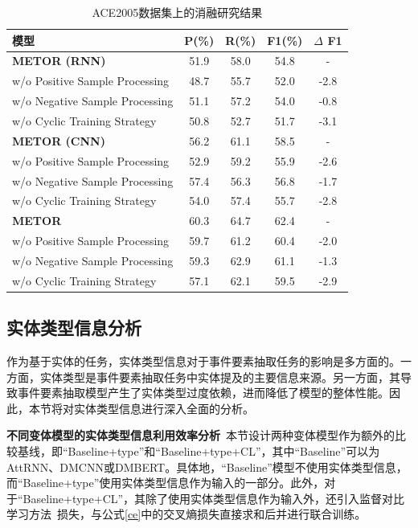 \begin{table}[htp]
\centering
\caption{ACE2005数据集上的消融研究结果}
\label{ablation}
\begin{tabular}{l|cccc}
\toprule
模型 & P(\%) & R(\%) & F1(\%) &$\Delta$ F1\\ 
\midrule
\textbf{METOR (RNN)} & 51.9      &  58.0      &  54.8  & -\\
w/o Positive Sample Processing & 48.7  & 55.7  & 52.0  & -2.8\\
w/o Negative Sample Processing & 51.1  & 57.2  & 54.0   & -0.8\\
w/o Cyclic Training Strategy & 50.8  & 52.7  & 51.7    & -3.1\\ 
\midrule
\textbf{METOR (CNN)} & 56.2      & 61.1      & 58.5  & -\\
w/o Positive Sample Processing & 52.9  & 59.2  & 55.9   & -2.6\\
w/o Negative Sample Processing & 57.4  & 56.3  & 56.8   & -1.7\\
w/o Cyclic Training Strategy & 54.0  & 57.4  & 55.7    & -2.8\\ 
\midrule
\textbf{METOR} & 60.3  & 64.7  & 62.4   & -\\
w/o Positive Sample Processing & 59.7      &  61.2     &  60.4      & -2.0\\
w/o Negative Sample Processing & 59.3  & 62.9  & 61.1   & -1.3\\ 
w/o Cyclic Training Strategy & 57.1  & 62.1  & 59.5   & -2.9\\  
\bottomrule
\end{tabular}
\end{table} 

\subsection{实体类型信息分析}
作为基于实体的任务，实体类型信息对于事件要素抽取任务的影响是多方面的。一方面，实体类型是事件要素抽取任务中实体提及的主要信息来源。另一方面，其导致事件要素抽取模型产生了实体类型过度依赖，进而降低了模型的整体性能。因此，本节将对实体类型信息进行深入全面的分析。

\textbf{不同变体模型的实体类型信息利用效率分析}~本节设计两种变体模型作为额外的比较基线，即“Baseline+type”和“Baseline+type+CL”，其中“Baseline”可以为AttRNN、DMCNN或DMBERT。具体地，“Baseline”模型不使用实体类型信息，而“Baseline+type”使用实体类型信息作为输入的一部分。此外，对于“Baseline+type+CL”，其除了使用实体类型信息作为输入外，还引入监督对比学习方法~\cite{khosla2020supervised}损失，与公式\ref{ce}中的交叉熵损失直接求和后并进行联合训练。

